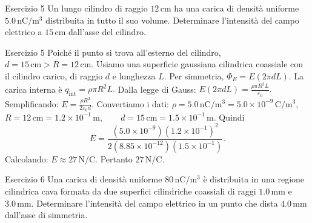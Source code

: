 \documentclass[a4paper]{article}
\begin{document}
\begin{snippetexercise}{Esercizio 5}
    Un lungo cilindro di raggio \(12\,\mathrm{cm}\) ha una carica di densità
    uniforme \(5.0\,\mathrm{nC/m^3}\) distribuita in tutto il suo volume.
    Determinare l'intensità del campo elettrico a \(15\,\mathrm{cm}\) dall'asse
    del cilindro.

\end{snippetexercise}
\begin{snippetsolution}{Esercizio 5}
    Poiché il punto si trova all'esterno del cilindro,
    \(d = 15\,\mathrm{cm} > R = 12\,\mathrm{cm}.\)
    Usiamo una superficie gaussiana cilindrica coassiale con il cilindro carico,
    di raggio \(d\) e lunghezza \(L\). Per simmetria,
    \(\Phi_E = E(2\pi dL).\)
    La carica interna è
    \(q_{\mathrm{int}} = \rho \pi R^2L.\)
    Dalla legge di Gauss:
    \(E(2\pi dL) = \frac{\rho \pi R^2L}{\varepsilon_0}.\)
    Semplificando:
    \(E = \frac{\rho R^2}{2\varepsilon_0 d}.\)
    Convertiamo i dati:
    \(\rho = 5.0\,\mathrm{nC/m^3} = 5.0 \times 10^{-9}\,\mathrm{C/m^3},\)
    \(R = 12\,\mathrm{cm} = 1.2 \times 10^{-1}\,\mathrm{m}, \qquad d = 15\,\mathrm{cm} = 1.5 \times 10^{-1}\,\mathrm{m}.\)
    Quindi
    \[
        E =
        \frac{
            \left(5.0 \times 10^{-9}\right)
            \left(1.2 \times 10^{-1}\right)^2
        }{
            2
            \left(8.85 \times 10^{-12}\right)
            \left(1.5 \times 10^{-1}\right)
        }.
    \]
    Calcolando:
    \(E \approx 27\,\mathrm{N/C}.\)
    Pertanto
    \(\boxed{27\,\mathrm{N/C}}.\)
\end{snippetsolution}
\begin{snippetexercise}{Esercizio 6}
    Una carica di densità uniforme \(80\,\mathrm{nC/m^3}\) è distribuita in una
    regione cilindrica cava formata da due superfici cilindriche coassiali di
    raggi \(1.0\,\mathrm{mm}\) e \(3.0\,\mathrm{mm}\).
    Determinare l'intensità del campo elettrico in un punto che dista
    \(4.0\,\mathrm{mm}\) dall'asse di simmetria.

\end{snippetexercise}
\end{document}
